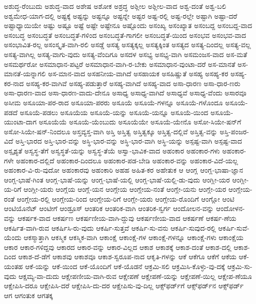 {ಅಶುದ್ಧ-ರೆಂಬುದು
ಅಶುದ್ಧ-ವಾದ
ಅಶೇಷ
ಅಶೋಕ
ಅಶ್ರದ್ಧ
ಅಶ್ಲೀಲ
ಅಶ್ಲೀಲ-ವಾದ
ಅಶ್ವ-ದಂತೆ
ಅಶ್ವ-ಬಲಿ
ಅಶ್ವಮೇಧ-ಯಾಗ-ದಲ್ಲಿ
ಅಷ್ಟಕ್ಕೆ
ಅಷ್ಟನ್ನು
ಅಷ್ಟನ್ನೂ
ಅಷ್ಟನ್ನೇ
ಅಷ್ಟರ
ಅಷ್ಟ-ರಲ್ಲಿ
ಅಷ್ಟ-ರಲ್ಲೇ
ಅಷ್ಟಾಗಿ
ಅಷ್ಟಾ-ದರೆ
ಅಷ್ಟಾಧ್ಯಾಯಿಯೇ
ಅಷ್ಟು
ಅಷ್ಟೂ
ಅಷ್ಟೆ
ಅಷ್ಟೇ
ಅಷ್ಟೇನೂ
ಅಷ್ಟೊಂದು
ಅಸಂಖ್ಯ
ಅಸಂಖ್ಯಾತ
ಅಸಂಬದ್ದ
ಅಸಂಬದ್ದ-ವಾದ
ಅಸಂಬದ್ಧ
ಅಸಂಬದ್ಧತೆ
ಅಸಂಬದ್ಧತೆ-ಗಳಿಂದ
ಅಸಂಬದ್ಧತೆ-ಗಾಗಲೀ
ಅಸಂಬದ್ಧತೆ-ಯಿಂದ
ಅಸಂಭವ
ಅಸಂಭವ-ವಾದ
ಅಸಂಭಾವಿತ-ರಲ್ಲ
ಅಸಂಸ್ಕೃತ-ವಾಗಿ-ರಲಿ
ಅಸಡ್ಡೆ
ಅಸತ್ಯ
ಅಸತ್ಯಕ್ಕಲ್ಲ
ಅಸತ್ಯಕ್ಕಿಂತ
ಅಸತ್ಯದ
ಅಸತ್ಯ-ದಿಂದಲ್ಲ
ಅಸತ್ಯ-ವಲ್ಲ
ಅಸತ್ಯ-ವಾಗಿಲ್ಲ
ಅಸತ್ಯ-ವಾಗು-ವುದು
ಅಸತ್ಯ-ವೆಂದಿಗೂ
ಅಸದಳ
ಅಸಭ್ಯ
ಅಸಭ್ಯ-ವಾಗಿ
ಅಸಮಂಜಸ-ವಾದ
ಅಸ-ಮತೆ
ಅಸಮರ್ಥರೋ
ಅಸಮಾಧಾನ-ಪಟ್ಟರೆ
ಅಸಮಾಧಾನ-ವಾಗಿ-ರ-ಬೇಕು
ಅಸಮಾಧಾನ-ವುಂಟಾ-ದರೆ
ಅಸ-ಮಾನತೆ
ಅಸ-ಮಾನತೆ-ಯನ್ನಾಗಲಿ
ಅಸ-ಮಾನ-ವಾದ
ಅಸಹನೀಯ-ವಾಗಿದೆ
ಅಸಹಾಯಕ
ಅಸಹಿಷ್ಣುತೆ
ಅಸಹ್ಯ
ಅಸಹ್ಯ-ಕರ
ಅಸಹ್ಯ-ಕರ-ನಾದ
ಅಸಹ್ಯ-ಕರ-ವಾಗಿವೆ
ಅಸಹ್ಯ-ಪಡುತ್ತಾರೆ
ಅಸಹ್ಯ-ವಾಗಿದೆ
ಅಸಹ್ಯ-ವಾದ
ಅಸಾ-ಧಾರಣ
ಅಸಾ-ಧಾರ-ಣರು
ಅಸಾ-ಧಾರಣ-ವಾದ
ಅಸಾ-ಧಾರಣ-ವಾದು-ದೇನೂ
ಅಸಾಧ್ಯ
ಅಸಾಧ್ಯ-ವಾಗಿದೆ
ಅಸಾಧ್ಯವೆ
ಅಸಾಧ್ಯ-ವೆಂದು
ಅಸಾರವೂ
ಅಸೀಮ
ಅಸೂಯಾ-ಪರ-ರಾದ
ಅಸೂಯಾ-ಪರರು
ಅಸೂಯೆ
ಅಸೂಯೆ-ಗಳನ್ನೂ
ಅಸೂಯೆ-ಗಳೊಂದೂ
ಅಸೂಯೆ-ಪಡದೆ
ಅಸೂಯೆ-ಪಡಲು
ಅಸೂಯೆಯ
ಅಸೂಯೆ-ಯನ್ನು
ಅಸೂಯೆ-ಯನ್ನೂ
ಅಸೂಯೆ-ಯಿಂದ
ಅಸೂಯೆ-ಯುಂಟಾ-ದಾಗ
ಅಸೂಯೆಯೆ
ಅಸೂಯೆ-ಯೆಂಬುದು
ಅಸೂಯೆಯೇ
ಅಸೂಯೆ-ಯೇನೊ
ಅಸೋ-ಸಿಯೇ-ಷನ್‌ಗೆ
ಅಸೋ-ಸಿಯೇ-ಷನ್‌-ನಿಂದಲೂ
ಅಸ್ತವ್ಯಸ್ತ-ವಾಗಿ
ಅಸ್ತಿ
ಅಸ್ತಿತ್ವ
ಅಸ್ತಿತ್ವಕ್ಕೂ
ಅಸ್ತಿತ್ವ-ದಲ್ಲಿವೆ
ಅಸ್ತಿತ್ವ-ವನ್ನು
ಅಸ್ತಿ-ಪಂಜರ-ವಿದೆ
ಅಸ್ತಿ-ಭಾರದ
ಅಸ್ತಿ-ಭಾರ-ವನ್ನು
ಅಸ್ಥಿ-ಭಾರ-ವನ್ನು
ಅಸ್ಥಿ-ಭಾರ-ವಾಗಿ
ಅಸ್ಥಿ-ಯನ್ನು
ಅಸ್ಪಷ್ಟ-ವಾಗಿ
ಅಸ್ಪಷ್ಟ-ವಾದ
ಅಸ್ಪೃಶ್ಯತೆ
ಅಸ್ವಸ್ಥ-ತೆಗೆ
ಅಸ್ವಸ್ಥತೆ-ಯನ್ನು
ಅಸ್ವಸ್ಥ-ತೆಯೆ
ಅಸ್ವಾ-ಭಾವಿಕ-ವಾದ
ಅಹಂಕಾರ
ಅಹಂಕಾರ-ಗಳು
ಅಹಂಕಾರ-ಗಳೇ
ಅಹಂಕಾರ-ದಲ್ಲಿದೆ
ಅಹಂಕಾರ-ದಿಂದಲೂ
ಅಹಂಕಾರ-ಪಡ-ಬೇಡಿ
ಅಹಂಕಾರ-ವನ್ನು
ಅಹಂಕಾರ-ವಿದೆ-ಯಲ್ಲ
ಅಹಂಕಾರ-ವಿ-ರು-ವುದೋ
ಅಹಂಕಾರವು
ಅಹಂಕಾರಿ
ಅಹಹ
ಅಹಿತ-ಕರ
ಅಹೇತುಕ
ಆ
ಆಂಗ್ಲ
ಆಂಗ್ಲ-ಭಾಷಾ-ಜ್ಞಾನ
ಆಂಗ್ಲ-ಭಾಷೆ-ಗಿಂತ
ಆಂಗ್ಲ-ಭಾಷೆ-ಯನ್ನು
ಆಂಗ್ಲ-ಭಾಷೆ-ಯಲ್ಲಿ
ಆಂಗ್ಲ-ಭಾಷೆ-ಯಲ್ಲಿ-ಡು-ವುದು
ಆಂಗ್ಲೀ-ಯರ
ಆಂಗ್ಲೀ-ಯ-ರಿಗೆ
ಆಂಗ್ಲೀ-ಯರು
ಆಂಗ್ಲೆಯ
ಆಂಗ್ಲೆ-ಯನ
ಆಂಗ್ಲೇಯ
ಆಂಗ್ಲೇಯ-ನಂತೆ
ಆಂಗ್ಲೇ-ಯನು
ಆಂಗ್ಲೇ-ಯರ
ಆಂಗ್ಲೇಯ-ರಂತೆ
ಆಂಗ್ಲೇಯ-ರಲ್ಲಿ
ಆಂಗ್ಲೇಯ-ರಿಂದ
ಆಂಗ್ಲೇಯ-ರಿಗೆ
ಆಂಗ್ಲೇ-ಯರು
ಆಂಗ್ಲೇಯ-ರೊಂದಿಗೆ
ಆಂಗ್ಲೋ
ಆಂಟಿ
ಆಂಟಿಯೊನೆಟ್
ಆಂಟೀಗೆ
ಆಂಡ್ರೂಸ್
ಆಂತರಿಕ
ಆಂತರಿಕ-ವಾಗಿ
ಆಂತರಿಕ-ಸ್ವರ್ಗ
ಆಂದೋಲನ-ವನ್ನು
ಆಂದೋಳನ-ವನ್ನು
ಆಕರ್ಷಕ-ವಾದ
ಆಕರ್ಷಣ
ಆಕರ್ಷಣೀಯ-ವಾಗಿ-ದ್ದುವು
ಆಕರ್ಷಣೀಯ-ವಾದ
ಆಕರ್ಷಣೆ
ಆಕರ್ಷ-ಣೆಯ
ಆಕರ್ಷಿತ-ವಾಗಿ-ರುವ
ಆಕರ್ಷಿಸಿ-ರು-ವುದು
ಆಕರ್ಷಿ-ಸುತ್ತವೆ
ಆಕರ್ಷಿ-ಸು-ವನು
ಆಕರ್ಷಿ-ಸುವುದ-ರಲ್ಲಿ
ಆಕರ್ಷಿ-ಸುವೆ-ಯೆಂದು
ಆಕಸ್ಮಾತ್ತಾಗಿ
ಆಕಸ್ಮಿಕ
ಆಕಸ್ಮಿಕ-ವಾಗಿ
ಆಕಾಂಕ್ಷೆ
ಆಕಾಂಕ್ಷೆ-ಗಳ
ಆಕಾಂಕ್ಷೆ-ಗಳನ್ನೂ
ಆಕಾಂಕ್ಷೆ-ಗಳು
ಆಕಾಂಕ್ಷೆಯ
ಆಕಾರ
ಆಕಾರ-ಗಳಿದ್ದವು
ಆಕಾರದ
ಆಕಾರ-ವನ್ನು
ಆಕಾರ-ವಿಲ್ಲದ
ಆಕಾಶ
ಆಕಾಶಕ್ಕೆ
ಆಕಾಶ-ದಂತೆ
ಆಕಾಶ-ದಲ್ಲಿ
ಆಕಾಶ-ದಿಂದ
ಆಕಾಶ-ದೆ-ಡೆಗೆ
ಆಕಾಶವು
ಆಕಾಶವೂ
ಆಕಾಶ-ಸ್ವರೂಪ-ನಾದ
ಆಕೃತಿ-ಗಳನ್ನು
ಆಕೆ
ಆಕೆಗೂ
ಆಕೆಗೆ
ಆಕೆಯ
ಆಕೆ-ಯಂತಹ
ಆಕೆ-ಯನ್ನು
ಆಕೆ-ಯಿಂದ
ಆಕೆ-ಯೊಂದಿಗೆ
ಆಕೆ-ಯೊಡನೆ
ಆಕ್ರಮಿ-ಸಲಿ
ಆಕ್ರಮಿಸಿ-ಕೊಳ್ಳು-ವು-ದಕ್ಕೆ
ಆಕ್ರಮಿ-ಸು-ವುದು
ಆಕ್ಷಮ್ಯ-ವಾ-ದುದು
ಆಕ್ಷೇಪಣೀಯ-ವಾಗಿ-ರುವ
ಆಕ್ಷೇಪಣೆ
ಆಕ್ಷೇಪಣೆ-ಯನ್ನು
ಆಕ್ಷೇಪಣೆ-ಯಿಲ್ಲ
ಆಕ್ಷೇಪ-ಣೆಯೂ
ಆಕ್ಷೇಪಿಸಿ-ದರೂ
ಆಕ್ಷೇಪಿಸಿ-ದರೆ
ಆಕ್ಷೇಪಿಸಿ-ದು-ದರ
ಆಕ್ಷೇಪಿಸು-ವು-ದಿಲ್ಲ
ಆಕ್ಸ್‌ಫರ್ಡ್‌ಗೆ
ಆಕ್ಸ್‌ಫರ್ಡ್‌ನ
ಆಕ್ಸ್‌ಫ‌ರ್ಡ್
ಆಗ
ಆಗಂತುಕ
ಆಗತಕ್ಕ
}
